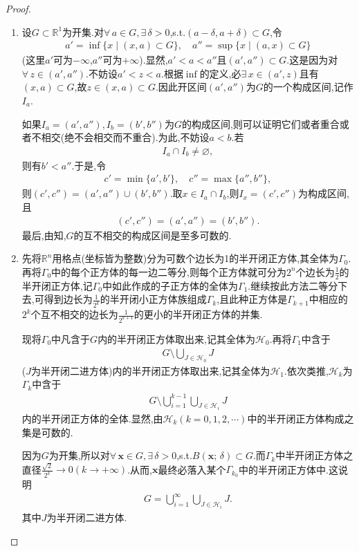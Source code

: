 \documentclass[../../main.tex]{subfiles}%
\begin{document}
\begin{proof}
\begin{enumerate}[(1)]
\item 设$G\subset\mathbb{R}^1$为开集.对$\forall\,a\in G,\exists\,\delta>0$,s.t.$(a-\delta,a+\delta)\subset G$,令
\begin{align*}
a'=\inf\{x\mid (x,a)\subset G\},\quad a''=\sup\{x\mid (a,x)\subset G\}
\end{align*}
(这里$a'$可为$-\infty$,$a''$可为$+\infty$).显然,$a'<a<a''$且$(a',a'')\subset G$.这是因为对$\forall\,z\in(a',a'')$.不妨设$a'<z<a$.根据$\inf$的定义,必$\exists\,x\in(a',z)$且有$(x,a)\subset G$,故$z\in(x,a)\subset G$.因此开区间$(a',a'')$为$G$的一个构成区间,记作$I_a$.

如果$I_a=(a',a''),I_b=(b',b'')$为$G$的构成区间,则可以证明它们或者重合或者不相交(绝不会相交而不重合).为此,不妨设$a<b$.若
\begin{align*}
I_a\cap I_b\neq\varnothing,
\end{align*}
则有$b'<a''$.于是,令
\begin{align*}
c'=\min\{a',b'\},\quad c''=\max\{a'',b''\},
\end{align*}
则$(c',c'')=(a',a'')\cup(b',b'')$.取$x\in I_a\cap I_b$,则$I_x=(c',c'')$为构成区间,且
\begin{align*}
(c',c'')=(a',a'')=(b',b'').
\end{align*}
最后,由知,$G$的互不相交的构成区间是至多可数的.

\item 先将$\mathbb{R}^n$用格点(坐标皆为整数)分为可数个边长为1的半开闭正方体,其全体为$\Gamma_0$.再将$\Gamma_0$中的每个正方体的每一边二等分,则每个正方体就可分为$2^n$个边长为$\frac{1}{2}$的半开闭正方体,记$\Gamma_0$中如此作成的子正方体的全体为$\Gamma_1$.继续按此方法二等分下去,可得到边长为$\frac{1}{2^k}$的半开闭小正方体族组成$\Gamma_k$,且此种正方体是$\Gamma_{k+1}$中相应的$2^k$个互不相交的边长为$\frac{1}{2^{k+1}}$的更小的半开闭正方体的并集.

现将$\Gamma_0$中凡含于$G$内的半开闭正方体取出来,记其全体为$\mathscr{H}_0$.再将$\Gamma_1$中含于
\begin{align*}
G\setminus\bigcup_{J\in\mathscr{H}_0}J
\end{align*}
($J$为半开闭二进方体)内的半开闭正方体取出来,记其全体为$\mathscr{H}_1$.依次类推,$\mathscr{H}_k$为$\Gamma_k$中含于
\begin{align*}
G\setminus\bigcup_{i=1}^{k-1}\bigcup_{J\in\mathscr{H}_i}J
\end{align*}
内的半开闭正方体的全体.显然,由$\mathscr{H}_k(k=0,1,2,\cdots)$中的半开闭正方体构成之集是可数的.

因为$G$为开集,所以对$\forall\,\boldsymbol{x}\in G,\exists\,\delta>0$,s.t.$B(\boldsymbol{x};\,\delta)\subset G$.而$\Gamma_k$中半开闭正方体之直径$\frac{\sqrt{2}}{2^k}\to0(k\to+\infty)$.从而,$\boldsymbol{x}$最终必落入某个$\Gamma_{k_0}$中的半开闭正方体中.这说明
\begin{align*}
G=\bigcup_{i=1}^{\infty}\bigcup_{J\in\mathscr{H}_i}J.
\end{align*}
其中$J$为半开闭二进方体.
\end{enumerate}
\end{proof}
\end{document}
